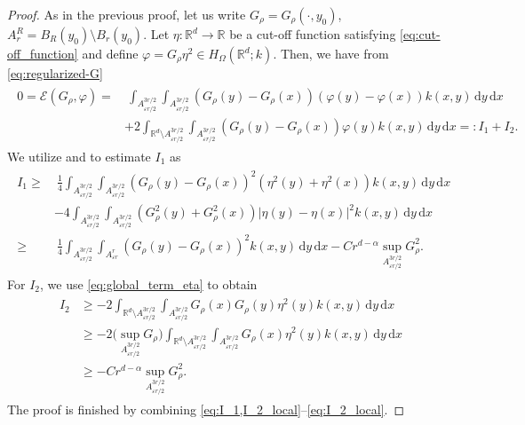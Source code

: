 \documentclass[reqno]{amsart}
\theoremstyle{plain}
\theoremstyle{definition}
\numberwithin{equation}{section}
\newcommand{\R}{\mathbb{R}}
\newcommand{\Rd}{\mathbb{R}^d}
\newcommand{\dx} {\, \mathrm{d}x}
\newcommand{\dy} {\, \mathrm{d}y}
\begin{document}
\begin{proof}
As in the previous proof, let us write $G_{\rho} = G_{\rho}(\cdot, y_0)$, $A^R_r = B_R(y_0) \setminus B_r(y_0)$.
Let $\eta : \Rd \rightarrow \R$ be a cut-off function satisfying 
\eqref{eq:cut-off_function} and define $\varphi = G_{\rho}\eta^2 \in H_{\Omega}(\Rd; k)$. Then, we have from \eqref{eq:regularized-G}
\begin{align} \label{eq:I_1,I_2_local}
\begin{split}
0 
= \mathcal{E}(G_{\rho}, \varphi) 
=&~ \int_{A^{3r/2}_{\varepsilon r/2}} \int_{A^{3r/2}_{\varepsilon r/2}} 
(G_{\rho}(y) - G_{\rho}(x))(\varphi(y) - \varphi(x)) k(x,y) \dy \dx \\
&+ 2 \int_{\Rd \setminus A^{3r/2}_{\varepsilon r/2}} 
\int_{A^{3r/2}_{\varepsilon r/2}} (G_{\rho}(y) - G_{\rho}(x)) \varphi(y) k(x,y) \dy \dx 
=: I_1 + I_2.
\end{split}
\end{align}
We utilize  and  to estimate $I_1$ as
\begin{align} \label{eq:I_1_local}
\begin{split}
I_1 
\geq&~ \frac{1}{4} \int_{A^{3r/2}_{\varepsilon r/2}} \int_{A^{3r/2}_{\varepsilon r/2}} 
(G_{\rho}(y) - G_{\rho}(x))^2 (\eta^2(y) + \eta^2(x)) k(x,y) \dy \dx \\
&- 4 \int_{A^{3r/2}_{\varepsilon r/2}} \int_{A^{3r/2}_{\varepsilon r/2}} 
(G_{\rho}^{2}(y) + G_{\rho}^{2}(x)) | \eta(y) - \eta(x) |^2 k(x,y) \dy \dx \\
\geq&~ \frac{1}{4} \int_{A^{3r/2}_{\varepsilon r/2}} \int_{A^r_{\varepsilon r}} 
(G_{\rho}(y) - G_{\rho}(x))^2 k(x,y) \dy \dx - C r^{d-\alpha} \sup_{A^{3r/2}_{\varepsilon r/2}} G_{\rho}^{2}.
\end{split}
\end{align}
For $I_2$, we use \eqref{eq:global_term_eta} to obtain
\begin{align} \label{eq:I_2_local}
\begin{split}
I_2 
&\geq -2 \int_{\Rd \setminus A^{3r/2}_{\varepsilon r/2}} 
\int_{A^{3r/2}_{\varepsilon r/2}} G_{\rho}(x) G_{\rho}(y) \eta^2(y) k(x,y) \dy \dx \\
&\geq -2 \bigg( \sup_{A^{3r/2}_{\varepsilon r/2}} G_{\rho} \bigg) 
\int_{\Rd \setminus A^{3r/2}_{\varepsilon r/2}} \int_{A^{3r/2}_{\varepsilon r/2}} 
G_{\rho}(x) \eta^2(y) k(x,y) \dy \dx \\
&\geq -C r^{d-\alpha} \sup_{A^{3r/2}_{\varepsilon r/2}} G_{\rho}^{2}.
\end{split}
\end{align}
The proof is finished by combining \eqref{eq:I_1,I_2_local}--\eqref{eq:I_2_local}.
\end{proof}
\end{document}
